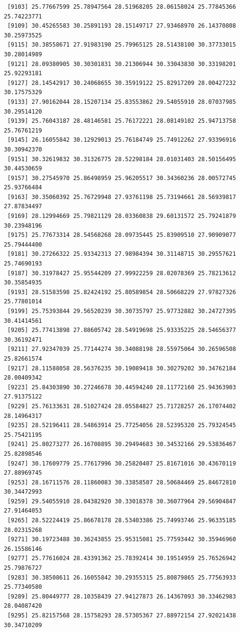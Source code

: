 \documentclass[
  letterpaper,
  DIV=11,
  numbers=noendperiod]{scrartcl}
\begin{document}
\begin{verbatim}
 [9103] 25.77667599 25.78947564 28.51968205 28.06158024 25.77845366 25.74223771
 [9109] 30.45265583 30.25891193 28.15149717 27.93468970 26.14370808 30.25973525
 [9115] 30.38558671 27.91983190 25.79965125 28.51438100 30.37733015 30.28014989
 [9121] 28.09380905 30.30301831 30.21306944 30.33043830 30.33198201 25.92293181
 [9127] 28.14542917 30.24068655 30.35919122 25.82917209 28.00427232 30.17575329
 [9133] 27.90162044 28.15207134 25.83553862 29.54055910 28.07037985 30.29514120
 [9139] 25.76043187 28.48146581 25.76172221 28.08149102 25.94713758 25.76761219
 [9145] 26.16055842 30.12929013 25.76184749 25.74912262 27.93396916 30.30942370
 [9151] 30.32619832 30.31326775 28.52298184 28.01031403 28.50156495 30.44530659
 [9157] 30.27545970 25.86498959 25.96205517 30.34360236 28.00572745 25.93766484
 [9163] 30.35060392 25.76729948 27.93761198 25.73194661 28.56939817 27.87834497
 [9169] 28.12994669 25.79821129 28.03360838 29.60131572 25.79241879 30.23948196
 [9175] 25.77673314 28.54568268 28.09735445 25.83909510 27.90909077 25.79444400
 [9181] 30.27266322 25.93342313 27.98984394 30.31148715 30.29557621 25.74690193
 [9187] 30.31978427 25.95544209 27.99922259 28.02078369 25.78213612 30.35854935
 [9193] 28.51583598 25.82424192 25.80589854 28.50668229 27.97827326 25.77801014
 [9199] 25.75393844 29.56520239 30.30735797 25.97732882 30.24727395 30.41414561
 [9205] 25.77413898 27.88605742 28.54919698 25.93335225 28.54656377 30.36192471
 [9211] 27.92347039 25.77144274 30.34088198 28.55975064 30.26596508 25.82661574
 [9217] 28.11588058 28.56376235 30.19089418 30.30279202 30.34762184 28.00409342
 [9223] 25.84303890 30.27246678 30.44594240 28.11772160 25.94363903 27.91375122
 [9229] 25.76133631 28.51027424 28.05584827 25.71728257 26.17074402 28.14964317
 [9235] 28.52196411 28.54863914 25.77254056 28.52395320 25.79324545 25.75421195
 [9241] 25.80273277 26.16708895 30.29494683 30.34532166 29.53836467 25.82898546
 [9247] 30.17609779 25.77617996 30.25820407 25.81671016 30.43670119 27.88969745
 [9253] 28.16711576 28.11860083 30.33858507 28.50684469 25.84672810 30.34472993
 [9259] 29.54055910 28.04382920 30.33018378 30.36077964 29.56904847 27.91464053
 [9265] 28.52224419 25.86678178 28.53403386 25.74993746 25.96335185 28.02315268
 [9271] 30.19723488 30.36243855 25.95315081 25.77593442 30.35946960 26.15586146
 [9277] 25.77616024 28.43391362 25.78392414 30.19514959 25.76526942 25.79876727
 [9283] 30.38508611 26.16055842 30.29355315 25.80879865 25.77563933 25.77340580
 [9289] 25.80449777 28.10358439 27.94127873 26.14367093 30.33462983 28.04087420
 [9295] 25.82157568 28.15758293 28.57305367 27.88972154 27.92021438 30.34710209

\end{verbatim}
\end{document}
